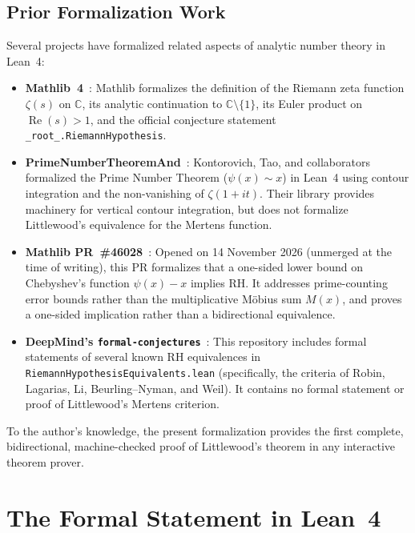 \documentclass[11pt,a4paper]{article}
\theoremstyle{definition}
\newcommand{\Cfield}{\mathbb{C}}
\begin{document}
\subsection{Prior Formalization Work}
\label{subsec:prior_work}

Several projects have formalized related aspects of analytic number theory in Lean~4:
\begin{itemize}[leftmargin=1.5em]
  \item \textbf{Mathlib~4}~\cite{Mathlib}: Mathlib formalizes the definition of the Riemann zeta function $\zeta(s)$ on $\Cfield$, its analytic continuation to $\Cfield \setminus \{1\}$, its Euler product on $\operatorname{Re}(s) > 1$, and the official conjecture statement \texttt{\_root\_.RiemannHypothesis}.
  \item \textbf{PrimeNumberTheoremAnd}~\cite{PNT}: Kontorovich, Tao, and collaborators formalized the Prime Number Theorem ($\psi(x) \sim x$) in Lean~4 using contour integration and the non-vanishing of $\zeta(1 + it)$. Their library provides machinery for vertical contour integration, but does not formalize Littlewood's equivalence for the Mertens function.
  \item \textbf{Mathlib PR~\#46028}~\cite{MathlibPR46028}: Opened on 14 November 2026 (unmerged at the time of writing), this PR formalizes that a one-sided lower bound on Chebyshev's function $\psi(x) - x$ implies RH. It addresses prime-counting error bounds rather than the multiplicative M\"obius sum $M(x)$, and proves a one-sided implication rather than a bidirectional equivalence.
  \item \textbf{DeepMind's \texttt{formal-conjectures}}~\cite{FormalConjectures}: This repository includes formal statements of several known RH equivalences in \texttt{RiemannHypothesisEquivalents.lean} (specifically, the criteria of Robin, Lagarias, Li, Beurling--Nyman, and Weil). It contains no formal statement or proof of Littlewood's Mertens criterion.
\end{itemize}

To the author's knowledge, the present formalization provides the first complete, bidirectional, machine-checked proof of Littlewood's theorem in any interactive theorem prover.

\section{The Formal Statement in Lean~4}
\label{sec:formal_statement}
\end{document}
